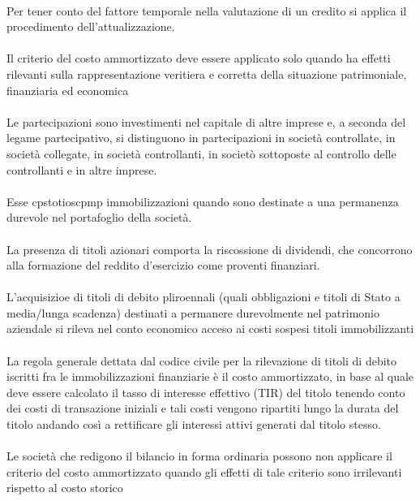 \documentclass{report}
\begin{document}
\\
Per tener conto del fattore temporale nella valutazione di un credito si applica il procedimento dell'attualizzazione.
\\
\\
Il criterio del costo ammortizzato deve essere applicato solo quando ha effetti rilevanti sulla rappresentazione veritiera e corretta della situazione patrimoniale, finanziaria ed economica
\\
\\
Le partecipazioni sono investimenti nel capitale di altre imprese e, a seconda del legame partecipativo, si distinguono in partecipazioni in società controllate, in società collegate, in società controllanti, in societò sottoposte al controllo delle controllanti e in altre imprese.
\\
\\
Esse cpstotioscpmp immobilizzazioni quando sono destinate a una permanenza durevole nel portafoglio della società. 
\\
\\
La presenza di titoli azionari comporta la riscossione di dividendi, che concorrono alla formazione del reddito d'esercizio come proventi finanziari.
\\
\\
L'acquisizioe di titoli di debito pliroennali (quali obbligazioni e titoli di Stato a media/lunga scadenza) destinati a permanere durevolmente nel patrimonio aziendale si rileva nel conto economico acceso ai costi sospesi titoli immobilizzanti
\\
\\
La regola generale dettata dal codice civile per la rilevazione di titoli di debito iscritti fra le immobilizzazioni finanziarie è il costo ammortizzato, in base al quale deve essere calcolato il tasso di interesse effettivo (TIR) del titolo tenendo conto dei costi di transazione iniziali e tali costi vengono ripartiti lungo la durata del titolo andando così a rettificare gli interessi attivi generati dal titolo stesso.
\\
\\
Le società che redigono il bilancio in forma ordinaria possono non applicare il criterio del costo ammortizzato quando gli effetti di tale criterio sono irrilevanti rispetto al costo storico
\end{document}
